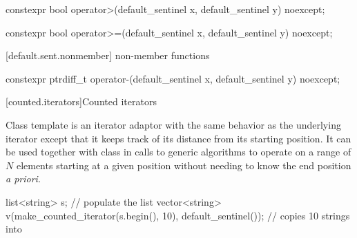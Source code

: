 \begin{addedblock}
\begin{itemdescr}
\pnum
\returns {}
\end{itemdescr}

%
%
\begin{itemdecl}
constexpr bool operator>(default_sentinel x, default_sentinel y) noexcept;
\end{itemdecl}

\begin{itemdescr}
\pnum
\returns {}
\end{itemdescr}

%
%
\begin{itemdecl}
constexpr bool operator>=(default_sentinel x, default_sentinel y) noexcept;
\end{itemdecl}

\begin{itemdescr}
\pnum
\returns {}
\end{itemdescr}

[default.sent.nonmember]{ non-member functions}

%
%
\begin{itemdecl}
constexpr ptrdiff_t operator-(default_sentinel x, default_sentinel y) noexcept;
\end{itemdecl}

\begin{itemdescr}
\pnum
\returns {}
\end{itemdescr}

[counted.iterators]{Counted iterators}

\pnum
Class template  is an iterator adaptor
with the same behavior as the underlying iterator except that it
keeps track of its distance from its starting position. It can be
used together with class  in calls to generic
algorithms to operate on a range of $N$ elements starting at a given
position without needing to know the end position \textit{a priori}.

\pnum
\enterexample

\begin{codeblock}
list<string> s;
// populate the list 
vector<string> v(make_counted_iterator(s.begin(), 10),
                 default_sentinel()); // copies 10 strings into 
\end{codeblock}


\end{addedblock}
